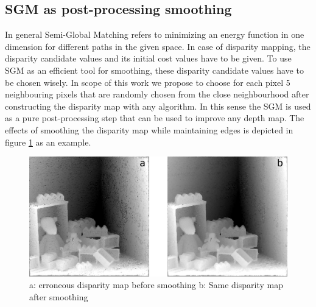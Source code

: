 \documentclass  [
  paper    = a4,
  BCOR     = 10mm,
  twoside,
  fontsize = 12pt,
  fleqn,
  toc      = bibnumbered,
  toc      = listofnumbered,
  numbers  = noendperiod,
  headings = normal,
  listof   = leveldown,
  version  = 3.03
]                                       {scrreprt}
\begin{document}
\subsection{SGM as post-processing smoothing}
\label{sec:postprocessing_smoothing}
In general Semi-Global Matching refers to minimizing an energy function in one dimension for different paths in the given space. In case of disparity mapping, the disparity candidate values and its initial cost values have to be given. To use SGM as an efficient tool for smoothing, these disparity candidate values have to be chosen wisely. In scope of this work we propose to choose for each pixel 5 neighbouring pixels that are randomly chosen from the close neighbourhood after constructing the disparity map with any algorithm. In this sense the SGM is used as a pure post-processing step that can be used to improve any depth map. The effects of smoothing the disparity map while maintaining edges is depicted in figure \ref{fig:sgmpprexample} as an example.
\begin{figure}
	\centering
	\includegraphics[width=1\linewidth]{images/sgm_ppr_example}
	\caption[Example for post-processing smoothing]{a: erroneous disparity map before smoothing b: Same disparity map after smoothing}
	\label{fig:sgmpprexample}
\end{figure}
\end{document}
